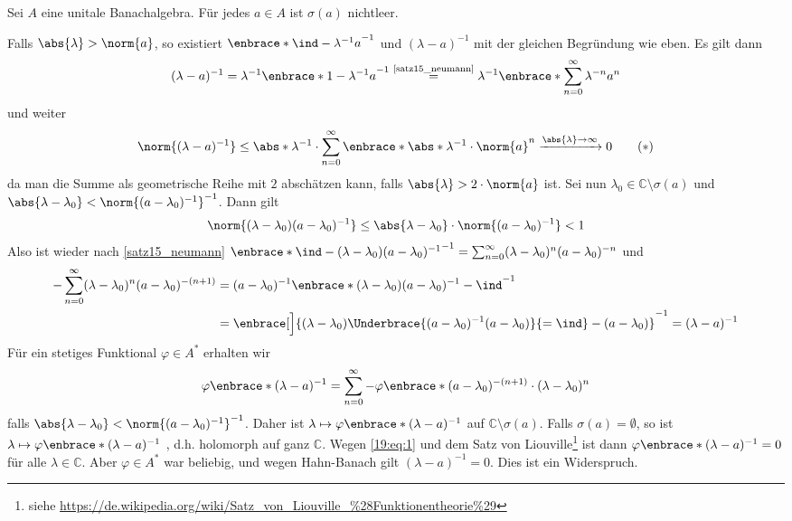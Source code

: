 \begin{satz}[{name=[In unitalen Banachalgebren sind die Spektren nie leer]},label=spec_nichtleer]
	Sei $A$ eine unitale Banachalgebra. Für jedes $a \in A$ ist $\sigma(a)$ nichtleer. 
\end{satz}
\begin{beweis}
	Falls $\abs{\lambda}> \norm{a}$, so existiert $\enbrace*{\ind- \lambda^{-1} a}^{-1}$ und $(\lambda-a)^{-1}$ mit der gleichen Begründung wie eben. Es gilt dann
	\begin{align}
		(\lambda-a)^{-1} = \lambda^{-1} \enbrace*{1- \lambda^{-1} a}^{-1} \stackrel{\mbox{\scriptsize\ref{satz15_neumann}}}{=} \lambda^{-1} \enbrace*{\sum_{n=0}^{\infty} 
		\lambda^{-n}a^n}
	\end{align}
	und weiter
	\[
		\norm{(\lambda-a)^{-1}} \le \abs*{\lambda^{-1}} \cdot \sum_{n=0}^{\infty} \enbrace*{\abs*{\lambda^{-1}} \cdot \norm{a}}^n  \xrightarrow{\abs{\lambda} \to \infty} 0 
		\label{19:eq:1} \tag{$*$}
	\]
	da man die Summe als geometrische Reihe mit $2$ abschätzen kann, falls $\abs{\lambda}> 2 \cdot \norm{a}$ ist.
	Sei nun $\lambda_0 \in \mathbb{C}\setminus \sigma(a)$ und $\abs{\lambda-\lambda_0}< \norm{(a- \lambda_0)^{-1}}^{-1}$. Dann gilt 
	\[
		\norm{(\lambda-\lambda_0)(a - \lambda_0)^{-1}} \le \abs{\lambda-\lambda_0} \cdot \norm{(a-\lambda_0)^{-1}} <1   
	\]
	Also ist wieder nach \autoref{satz15_neumann} $\enbrace*{\ind- (\lambda-\lambda_0)(a-\lambda_0)^{-1}}^{-1} = \sum_{n=0}^{\infty} (\lambda-\lambda_0)^n (a-\lambda_0)^{-n}$ und 
	\begin{align}
		-\sum_{n=0}^{\infty} (\lambda-\lambda_0)^n(a-\lambda_0)^{-(n+1)} &= (a- \lambda_0)^{-1} \enbrace*{(\lambda-\lambda_0)(a-\lambda_0)^{-1}-\ind}^{-1} \\
		&= \enbrace[\Big]{(\lambda-\lambda_0) \Underbrace{(a-\lambda_0)^{-1}(a-\lambda_0)}{=\ind}-(a- \lambda_0)}^{-1} = (\lambda-a)^{-1}
	\end{align}
	Für ein stetiges Funktional $\varphi \in A^*$ erhalten wir 
	\[
		\varphi\enbrace*{(\lambda-a)^{-1}} = \sum_{n=0}^{\infty} - \varphi \enbrace*{(a-\lambda_0)^{-(n+1)}} \cdot (\lambda-\lambda_0)^n
	\]
	falls $\abs{\lambda-\lambda_0} < \norm{(a- \lambda_0)^{-1}}^{-1}$. Daher ist $\lambda \mapsto \varphi \enbrace*{(\lambda-a)^{-1}}$  auf 
	$\mathbb{C}\setminus \sigma(a)$. Falls $\sigma(a)= \emptyset$, so ist $\lambda \mapsto \varphi \enbrace*{(\lambda-a)^{-1}}$ , d.h. holomorph 
	auf ganz $\mathbb{C}$. Wegen \eqref{19:eq:1} und dem Satz von Liouville\footnote{siehe \url{https://de.wikipedia.org/wiki/Satz_von_Liouville_\%28Funktionentheorie\%29}} ist 
	dann $\varphi \enbrace*{(\lambda-a)^{-1}}=0$ für alle $\lambda\in \mathbb{C}$. Aber $\varphi \in A^*$ war beliebig, und wegen Hahn-Banach gilt $(\lambda-a)^{-1}=0$. Dies 
	ist ein Widerspruch. 
\end{beweis}


